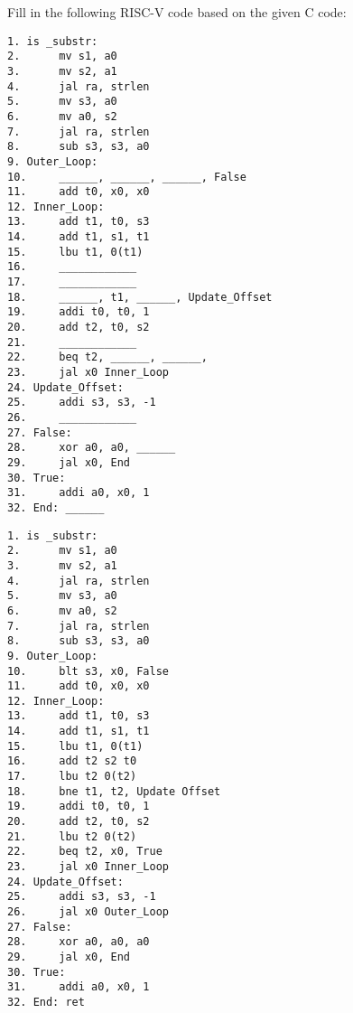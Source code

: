\begin{blocksection}
\question
Fill in the following RISC-V code based on the given C code:

\begin{verbatim}
1. is _substr:
2. 	    mv s1, a0
3. 	    mv s2, a1
4. 	    jal ra, strlen
5. 	    mv s3, a0
6. 	    mv a0, s2
7. 	    jal ra, strlen
8. 	    sub s3, s3, a0
9. Outer_Loop:
10.     ______, ______, ______, False
11.     add t0, x0, x0
12. Inner_Loop:
13.     add t1, t0, s3
14.     add t1, s1, t1
15.     lbu t1, 0(t1)
16.     ____________
17.     ____________
18.     ______, t1, ______, Update_Offset
19.     addi t0, t0, 1
20.     add t2, t0, s2
21.     ____________
22.     beq t2, ______, ______,
23.     jal x0 Inner_Loop
24. Update_Offset: 
25.     addi s3, s3, -1
26.     ____________
27. False: 
28.     xor a0, a0, ______
29.     jal x0, End
30. True: 
31.     addi a0, x0, 1
32. End: ______
\end{verbatim}

\end{blocksection}
\begin{solution}
\begin{verbatim}
1. is _substr:
2. 	    mv s1, a0
3. 	    mv s2, a1
4. 	    jal ra, strlen
5. 	    mv s3, a0
6. 	    mv a0, s2
7. 	    jal ra, strlen
8. 	    sub s3, s3, a0
9. Outer_Loop:
10.     blt s3, x0, False
11.     add t0, x0, x0
12. Inner_Loop:
13.     add t1, t0, s3
14.     add t1, s1, t1
15.     lbu t1, 0(t1)
16.     add t2 s2 t0
17.     lbu t2 0(t2)
18.     bne t1, t2, Update Offset
19.     addi t0, t0, 1
20.     add t2, t0, s2
21.     lbu t2 0(t2)
22.     beq t2, x0, True
23.     jal x0 Inner_Loop
24. Update_Offset: 
25.     addi s3, s3, -1
26.     jal x0 Outer_Loop
27. False: 
28.     xor a0, a0, a0
29.     jal x0, End
30. True: 
31.     addi a0, x0, 1
32. End: ret
\end{verbatim}
\end{solution}


